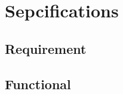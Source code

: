 \documentclass{article}
\begin{document}
    \section{Sepcifications}
    \label{sec:specs}
    \paragraph{}
    \lipsum[1-2]

    \subsection{Requirement}
    \label{subsec:requirement}
    \paragraph{}
    \lipsum[1-2]

    \subsection{Functional}
    \label{subsec:functional}
    \paragraph{}
    \lipsum[1-2]
\end{document}
